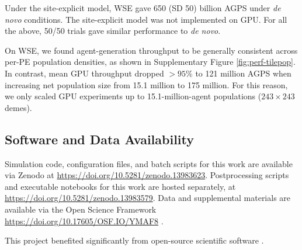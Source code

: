Under the site-explicit model, WSE gave 650 (SD 50) billion AGPS under \textit{de novo} conditions.
The site-explicit model was not implemented on GPU.
For all the above, 50/50 trials gave similar performance to \textit{de novo}.

On WSE, we found agent-generation throughput to be generally consistent across per-PE population densities, as shown in Supplementary Figure \ref{fig:perf-tilepop}.
In contrast, mean GPU throughput dropped $>95\%$ to 121 million AGPS when increasing net population size from 15.1 million to 175 million.
For this reason, we only scaled GPU experiments up to 15.1-million-agent populations ($243 \times 243$ demes).

\subsection{Software and Data Availability} \label{sec:materials}

Simulation code, configuration files, and batch scripts for this work are available via Zenodo at \url{https://doi.org/10.5281/zenodo.13983623}.
Postprocessing scripts and executable notebooks for this work are hosted separately, at \url{https://doi.org/10.5281/zenodo.13983579}.
Data and supplemental materials are available via the Open Science Framework \url{https://doi.org/10.17605/OSF.IO/YMAF8} \citep{foster2017open}.

This project benefited significantly from open-source scientific software \citep{2020SciPy-NMeth,harris2020array,reback2020pandas,mckinney-proc-scipy-2010,waskom2021seaborn,hunter2007matplotlib,moreno2023teeplot}.
